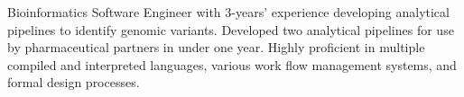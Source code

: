 

\begin{cvparagraph}

Bioinformatics Software Engineer with 3-years’ experience developing analytical pipelines to identify genomic variants. Developed two analytical pipelines for use by pharmaceutical partners in under one year. Highly proficient in multiple compiled and interpreted languages, various work flow management systems, and formal design processes.


\end{cvparagraph}
